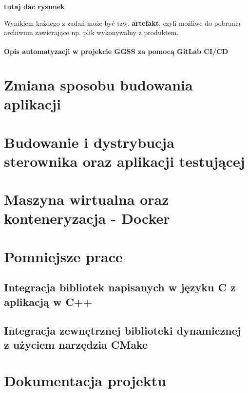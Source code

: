 \textbf{tutaj dac rysunek}

Wynikiem każdego z zadań może być tzw. \textbf{artefakt}, czyli możliwe do pobrania archiwum zawierające np. plik wykonywalny z produktem. 


\paragraph*{Opis automatyzacji w projekcie GGSS za pomocą GitLab CI/CD}


\section{Zmiana sposobu budowania aplikacji}

\section{Budowanie i dystrybucja sterownika oraz aplikacji testującej}

\section{Maszyna wirtualna oraz konteneryzacja - Docker}

\section{Pomniejsze prace}
\subsection{Integracja bibliotek napisanych w języku C z aplikacją w C++}
\subsection{Integracja zewnętrznej biblioteki dynamicznej z użyciem narzędzia CMake}

\section{Dokumentacja projektu}

